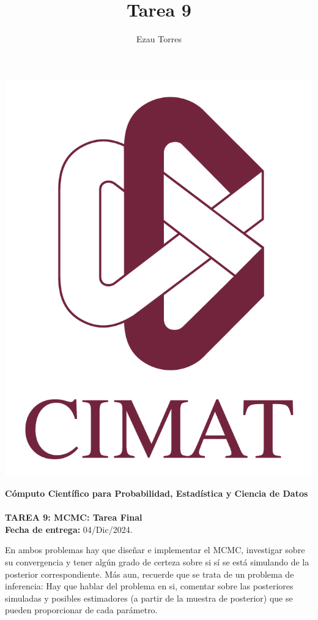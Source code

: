 \documentclass[a4paper,12pt]{article}
\title{Tarea 9}
\author{Ezau Torres}
\begin{document}
	\begin{minipage}{0.15\textwidth}
		\centering
		\includegraphics[width=\textwidth]{IMAGENES/logo}
	\end{minipage}
	\begin{minipage}{0.85\textwidth}
		\centering
		\textbf{\large Cómputo Científico para Probabilidad, Estadística y Ciencia de Datos}\\
		\medskip
		 \\
		\medskip
		\textbf{\large TAREA 9: MCMC: Tarea Final}\\
		\medskip
		\textbf{Fecha de entrega:} 04/Dic/2024.
	\end{minipage}

\vspace{5mm}

En ambos problemas hay que diseñar e implementar el MCMC, investigar sobre su convergencia y tener algún grado de certeza sobre si sí se está simulando de la posterior correspondiente. Más aun, recuerde que se trata de un problema de inferencia: Hay que hablar del problema en si, comentar sobre las posteriores simuladas y posibles estimadores (a partir de la muestra de posterior) que se pueden proporcionar de cada parámetro.
\end{document}
